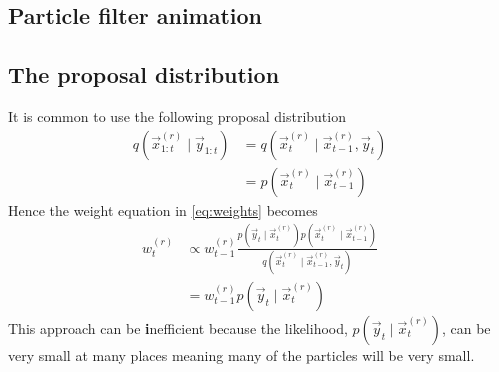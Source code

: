 \subsection{Particle filter animation}

\subsection{The proposal distribution}
    It is common to use the following proposal distribution
    \begin{align}
        q(\vec x_{1:t}^{(r)} \mid \vec y_{1:t})     &= q(\vec x_t^{(r)} \mid \vec x_{t - 1}^{(r)}, \vec y_t) \\
                                                    &= p(\vec x_t^{(r)} \mid \vec x_{t - 1}^{(r)})
    \end{align}
    Hence the weight equation in \eqref{eq:weights} becomes
    \begin{align}
        w_t^{(r)}   &\propto w_{t - 1}^{(r)} \frac{p\left(\vec y_t \mid \vec x_t^{(r)}\right) p\left(\vec x_t^{(r)} \mid \vec x_{t - 1}^{(r)}\right)}{q\left(\vec x_t^{(r)} \mid \vec x_{t - 1}^{(r)}, \vec y_t\right)} \\
                    &= w_{t - 1}^{(r)} p\left(\vec y_t \mid \vec x_t^{(r)}\right)
    \end{align}
    This approach can be \textbf inefficient because the likelihood, $p\left(\vec y_t \mid \vec x_t^{(r)}\right)$, can be very small at many places meaning many of the particles will be very small.

